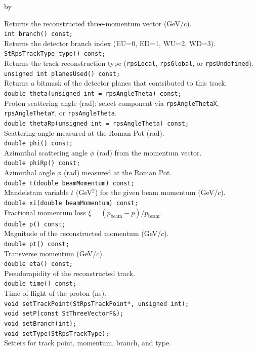 \documentclass[twoside]{article}
\newcommand{\entrylabel}[1]{\mbox{\textbf{{#1}}}\hfil}%
\newenvironment{entry}
{\begin{list}{}%
    {\renewcommand{\makelabel}{\entrylabel}%
     \setlength{\labelwidth}{90pt}%
     \setlength{\leftmargin}{\labelwidth}
     \advance\leftmargin by \labelsep%
      }%
    }%
  {\end{list}}
\newcommand{\Entrylabel}[1]%
{\raisebox{0pt}[1ex][0pt]{\makebox[\labelwidth][l]%
    {\parbox[t]{\labelwidth}{\hspace{0pt}\textbf{{#1}}}}}}
\newenvironment{Entry}%
{\renewcommand{\entrylabel}{\Entrylabel}\begin{entry}}%
  {\end{entry}}
\begin{document}
\begin{Entry}
    Returns the reconstructed three-momentum vector (GeV/$c$).\\
    \verb+int branch() const;+\\
    Returns the detector branch index (EU=0, ED=1, WU=2, WD=3).\\
    \verb+StRpsTrackType type() const;+\\
    Returns the track reconstruction type (\texttt{rpsLocal}, \texttt{rpsGlobal},
    or \texttt{rpsUndefined}).\\
    \verb+unsigned int planesUsed() const;+\\
    Returns a bitmask of the detector planes that contributed to this track.\\
    \verb+double theta(unsigned int = rpsAngleTheta) const;+\\
    Proton scattering angle (rad); select component via \texttt{rpsAngleThetaX},
    \texttt{rpsAngleThetaY}, or \texttt{rpsAngleTheta}.\\
    \verb+double thetaRp(unsigned int = rpsAngleTheta) const;+\\
    Scattering angle measured at the Roman Pot (rad).\\
    \verb+double phi() const;+\\
    Azimuthal scattering angle $\phi$ (rad) from the momentum vector.\\
    \verb+double phiRp() const;+\\
    Azimuthal angle $\phi$ (rad) measured at the Roman Pot.\\
    \verb+double t(double beamMomentum) const;+\\
    Mandelstam variable $t$ (GeV$^2$) for the given beam momentum (GeV/$c$).\\
    \verb+double xi(double beamMomentum) const;+\\
    Fractional momentum loss $\xi = (p_\mathrm{beam} - p) / p_\mathrm{beam}$.\\
    \verb+double p() const;+\\
    Magnitude of the reconstructed momentum (GeV/$c$).\\
    \verb+double pt() const;+\\
    Transverse momentum (GeV/$c$).\\
    \verb+double eta() const;+\\
    Pseudorapidity of the reconstructed track.\\
    \verb+double time() const;+\\
    Time-of-flight of the proton (ns).\\
    \verb+void setTrackPoint(StRpsTrackPoint*, unsigned int);+\\
    \verb+void setP(const StThreeVectorF&);+\\
    \verb+void setBranch(int);+\\
    \verb+void setType(StRpsTrackType);+\\
    Setters for track point, momentum, branch, and type.\\
\end{Entry}
\clearpage
\end{document}
